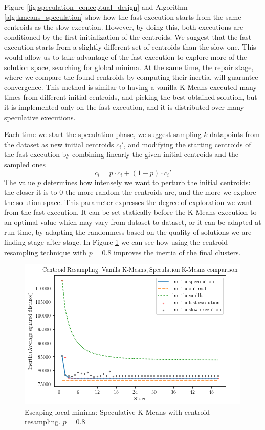 Figure \ref{fig:speculation_conceptual_design} and Algorithm \ref{alg:kmeans_speculation} show how the fast execution starts from the same centroids as the slow execution. However, by doing this, both executions are conditioned by the first initialization of the centroids. We suggest that the fast execution starts from a slightly different set of centroids than the slow one. This would allow us to take advantage of the fast execution to explore more of the solution space, searching for global minima.  At the same time, the repair stage, where we compare the found centroids by computing their inertia, will guarantee convergence. This method is similar to having a vanilla K-Means executed many times from different initial centroids, and picking the best-obtained solution, but it is implemented only on the fast execution, and it is distributed over many speculative executions.

Each time we start the speculation phase, we suggest sampling $k$ datapoints from the dataset as new initial centroids $c_i'$, and modifying the starting centroids of the fast execution by combining linearly the given initial centroids and the sampled ones
\begin{equation}
c_i = p \cdot c_i + (1-p) \cdot c_i'
\end{equation} The value $p$ determines how intensely we want to perturb the initial centroids: the closer it is to $0$ the more random the centroids are, and the more we explore the solution space. This parameter expresses the degree of exploration we want from the fast execution. It can be set statically before the K-Means execution to an optimal value which may vary from dataset to dataset, or it can be adapted at run time, by adapting the randomness based on the quality of solutions we are finding stage after stage.
In Figure \ref{fig:vanilla_speculation_comparison_resampling} we can see how using the centroid resampling technique with $p = 0.8$ improves the inertia of the final clusters.
\begin{figure}[ht]
\centering
\includegraphics[width=\linewidth]{./plots/vanilla_speculation_comparison_resampling_centroids.png}
\caption{Escaping local minima: Speculative K-Means with centroid resampling. $p = 0.8$}
\label{fig:vanilla_speculation_comparison_resampling}
\end{figure}


